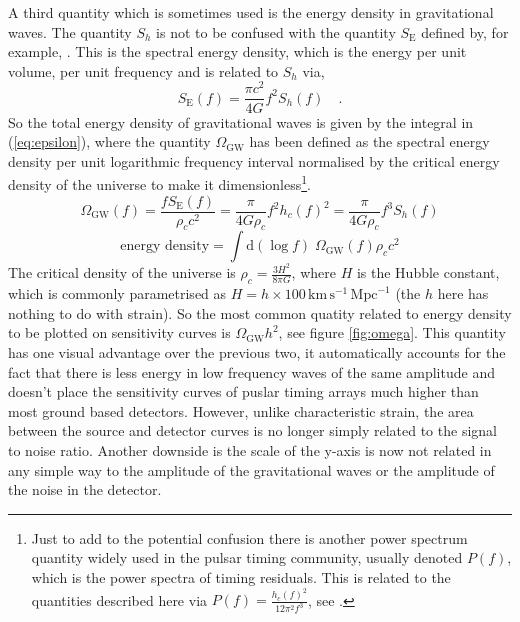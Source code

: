 A third quantity which is sometimes used is the energy density in gravitational waves. The quantity $S_{h}$ is not to be confused with the quantity $S_{\textrm{E}}$ defined by, for example, \cite{HellingsDowns}. This is the spectral energy density, which is the energy per unit volume, per unit frequency and is related to $S_{h}$ via,
\begin{equation}\label{eq:spectralenergydensity} S_{\textrm{E}}(f)=\frac{\pi c^{2}}{4G} f^{2}S_{h}(f) \quad . \end{equation}
So the total energy density of gravitational waves is given by the integral in (\ref{eq:epsilon}), where the quantity $\Omega_{\textrm{GW}}$ has been defined as the spectral energy density per unit logarithmic frequency interval normalised by the critical energy density of the universe to make it dimensionless\footnote{Just to add to the potential confusion there is another power spectrum quantity widely used in the pulsar timing community, usually denoted $P(f)$, which is the power spectra of timing residuals. This is related to the quantities described here via $P(f)=\frac{h_{c}(f)^{2}}{12\pi^{2}f^{3}}$, see \cite{Jenet}.}.
\begin{equation}\label{eq:omega} \Omega_{\textrm{GW}}(f)=\frac{fS_{\textrm{E}}(f)}{\rho_{c}c^{2}}=\frac{\pi}{4G\rho_{c}}f^{2}h_{c}(f)^{2}=\frac{\pi}{4G\rho_{c}}f^{3}S_{h}(f)  \end{equation}
\begin{equation}\label{eq:epsilon} \textrm{energy density}=\int \textrm{d}\left( \log f \right)\; \Omega_{\textrm{GW}}(f) \rho_{c}c^{2}\end{equation}
The critical density of the universe is $\rho_{c}=\frac{3H^{2}}{8\pi G}$, where $H$ is the Hubble constant, which is commonly parametrised as $H=h\times 100\, \textrm{km}\,\textrm{s}^{-1}\,\textrm{Mpc}^{-1}$ (the $h$ here has nothing to do with strain). So the most common quatity related to energy density to be plotted on sensitivity curves is $\Omega_{\textrm{GW}}h^{2}$, see figure \ref{fig:omega}. This quantity has one visual advantage over the previous two, it automatically accounts for the fact that there is less energy in low frequency waves of the same amplitude and doesn't place the sensitivity curves of puslar timing arrays much higher than most ground based detectors. However, unlike characteristic strain, the area between the source and detector curves is no longer simply related to the signal to noise ratio. Another downside is the scale of the y-axis is now not related in any simple way to the amplitude of the gravitational waves or the amplitude of the noise in the detector.

